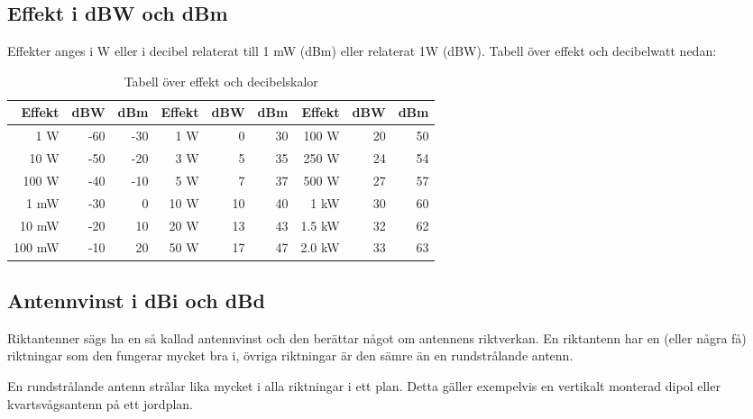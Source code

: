 \subsection{Effekt i dBW och dBm}

Effekter anges i W eller i decibel relaterat till 1 mW (dBm) eller relaterat
1W (dBW). Tabell över effekt och decibelwatt nedan:

\begin{table}[H]
\centering
\begin{tabular}{rrr|rrr|rrr}
	\textbf{Effekt} & \textbf{dBW} & \textbf{dBm} & \textbf{Effekt} & \textbf{dBW} & \textbf{dBm} & \textbf{Effekt} & \textbf{dBW} & \textbf{dBm} \\ \hline
	    1 \textmu W &          -60 &          -30 &             1 W &            0 &           30 &           100 W &           20 &           50 \\
	   10 \textmu W &          -50 &          -20 &             3 W &            5 &           35 &           250 W &           24 &           54 \\
	  100 \textmu W &          -40 &          -10 &             5 W &            7 &           37 &           500 W &           27 &           57 \\
	           1 mW &          -30 &            0 &            10 W &           10 &           40 &            1 kW &           30 &           60 \\
	          10 mW &          -20 &           10 &            20 W &           13 &           43 &          1.5 kW &           32 &           62 \\
	         100 mW &          -10 &           20 &            50 W &           17 &           47 &          2.0 kW &           33 &           63
\end{tabular}
\caption{Tabell över effekt och decibelskalor}
\end{table}

\subsection{Antennvinst i dBi och dBd}

Riktantenner sägs ha en så kallad antennvinst och den berättar något om
antennens riktverkan. En riktantenn har en (eller några få) riktningar som den
fungerar mycket bra i, övriga riktningar är den sämre än en rundstrålande
antenn.

En rundstrålande antenn strålar lika mycket i alla riktningar i ett plan.
Detta gäller exempelvis en vertikalt monterad dipol eller kvartsvågsantenn på
ett jordplan.

